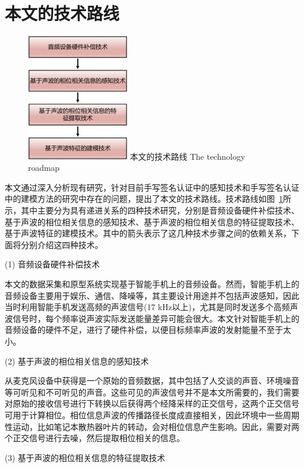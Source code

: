 \section{本文的技术路线}
\begin{figure}[!htp]
  \centering
  \includegraphics[width=0.4\textwidth]{figure/technique-road.pdf}
  \bicaption
    {本文的技术路线}
    {The technology roadmap}
  \label{fig:technology-roadmap}
\end{figure}
本文通过深入分析现有研究，针对目前手写签名认证中的感知技术和手写签名认证中的建模方法的研究中存在的问题，提出了本文的技术路线。技术路线如图~\ref{fig:technology-roadmap}所示，其中主要分为具有递进关系的四种技术研究，分别是音频设备硬件补偿技术、基于声波的相位相关信息的感知技术、基于声波的相位相关信息的特征提取技术、基于声波特征的建模技术。其中的箭头表示了这几种技术步骤之间的依赖关系，下面将分别介绍这四种技术。

(1) 音频设备硬件补偿技术

本文的数据采集和原型系统实现基于智能手机上的音频设备。然而，智能手机上的音频设备主要用于娱乐、通信、降噪等，其主要设计用途并不包括声波感知，因此当时利用智能手机发送高频的声波信号(17 kHz以上)，尤其是同时发送多个高频声波信号时，每个频率说声波实际发送能量差异可能会很大。本文针对智能手机上的音频设备的硬件不足，进行了硬件补偿，以便目标频率声波的发射能量不至于太小。

(2) 基于声波的相位相关信息的感知技术

从麦克风设备中获得是一个原始的音频数据，其中包括了人交谈的声音、环境噪音等可听见和不可听见的声音。这些可见的声波信号并不是本文所需要的，我们需要对原始的接收信号进行下转换以后获得两个经降采样的正交信号，这两个正交信号可用于计算相位。相位信息声波的传播路径长度成直接相关，因此环境中一些周期性运动，比如笔记本散热器叶片的转动，会对相位信息产生影响。因此，需要对两个正交信号进行去噪，然后提取相位相关的信息。

(3) 基于声波的相位相关信息的特征提取技术

